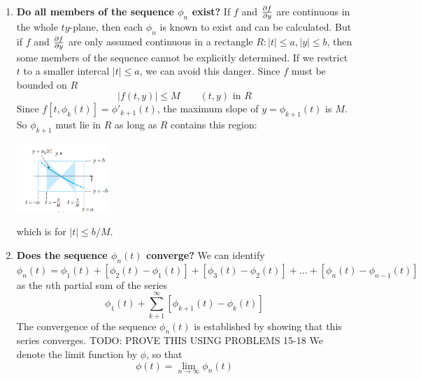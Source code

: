     \begin{enumerate}
        \item \textbf{Do all members of the sequence ${\phi_n}$ exist?}
            \newline \indent
            If $f$ and $\pdv{f}{y}$ are continuous in the whole $ty$-plane, then each $\phi_n$ is known to exist and can be calculated. But if $f$ and $\pdv{f}{y}$ are only assumed continuous in a rectangle $R: |t| \leq a, |y| \leq b$, then some members of the sequence cannot be explicitly determined. If we restrict $t$ to a smaller intercal $|t| \leq a$, we can avoid this danger. Since $f$ must be bounded on $R$
            \begin{equation*}
                |f(t, y)| \leq M \qquad (t, y)\text{ in }R
            \end{equation*}
            Since $f[t, \phi_k(t)] = \phi'_{k+1}(t)$, the maximum slope of $y = \phi_{k+1}(t)$ is $M$. So $\phi_{k+1}$ must lie in $R$ as long as $R$ contains this region:
            \begin{center}
                \includegraphics[width=100pt]{wedge.png}
            \end{center}
            which is for $|t| \leq b/M$.
        \item \textbf{Does the sequence ${\phi_n(t)}$ converge?}
            \newline \indent
            We can identify $\phi_n(t) = \phi_1(t) + [\phi_2(t) - \phi_1(t)] + [\phi_3(t) - \phi_2(t)] + \dots + [\phi_n(t) - \phi_{n-1}(t)]$ as the $n$th partial sum of the series
            \begin{equation*}
                \phi_1(t) + \sum_{k+1}^\infty [\phi_{k+1}(t) - \phi_k(t)]
            \end{equation*}
            The convergence of the sequence ${\phi_n(t)}$ is established by showing that this series converges. 
            \newline
            TODO: PROVE THIS USING PROBLEMS 15-18
            \newline
            We denote the limit function by $\phi$, so that
            \begin{equation*}
                \phi(t) = \lim_{n \rightarrow \infty} \phi_n(t)
            \end{equation*}
            

\end{enumerate}
